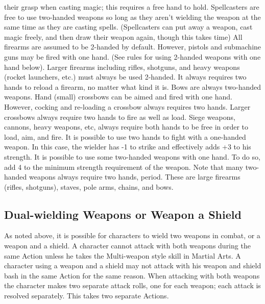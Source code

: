 \documentclass[twoside]{book}
\begin{document}
               their grasp when casting magic; this requires a free hand
               to hold. Spellcasters are free to use two-handed weapons
               so long as they aren’t wielding the weapon at the
               same time as they are casting spells. (Spellcasters can
               put away a weapon, cast magic freely, and then draw their
               weapon again, though this takes time)  All firearms are assumed to be 2-handed by default.
               However, pistols and submachine guns may be fired with one
               hand. (See rules for using 2-handed weapons with one hand
               below). Larger firearms including rifles, shotguns, and
               heavy weapons (rocket launchers, etc.) must always be used
               2-handed. It always requires two hands to reload a
               firearm, no matter what kind it is.  Bows are always two-handed weapons. Hand (small)
               crossbows can be aimed and fired with one hand. However,
               cocking and re-loading a crossbow always requires two
               hands. Larger crossbows always require two hands to fire
               as well as load. Siege weapons, cannons, heavy weapons,
               etc, always require both hands to be free in order to
               load, aim, and fire.  It is possible to use two hands to fight with a
               one-handed weapon. In this case, the wielder has -1 to
               strike and effectively adds +3 to his strength.  It is possible to use some two-handed weapons with
               one hand. To do so, add 4 to the minimum strength
               requirement of the weapon. Note that many two-handed
               weapons always require two hands, period. These are large
               firearms (rifles, shotguns), staves, pole arms, chains,
               and bows. 
\subsection{Dual-wielding Weapons or Weapon a Shield}
     As noted above, it is possible for characters to
               wield two weapons in combat, or a weapon and a shield. A
               character cannot attack with both weapons during the same
               Action unless he takes the Multi-weapon style skill in
               Martial Arts. A character using a weapon and a shield may
               not attack with his weapon and shield bash in the same
               Action for the same reason. When attacking with both
               weapons the character makes two separate attack rolls, one
               for each weapon; each attack is resolved separately. This
               takes two separate Actions.   
                
\end{document}
